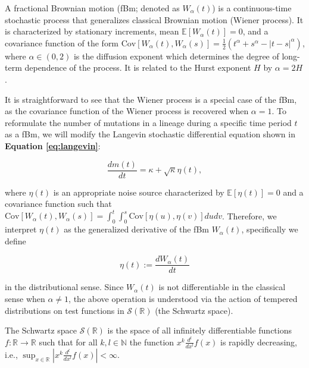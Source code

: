 \begin{definition}
    A fractional Brownian motion (fBm; denoted as $W_\alpha(t)$) is a continuous-time stochastic process that generalizes classical Brownian motion (Wiener process). It is characterized by stationary increments, mean $\mathbb{E}\left[W_\alpha(t)\right]=0$, and a covariance function of the form $\text{Cov}\left[W_\alpha(t),W_\alpha(s)\right] = \frac{1}{2}\left(t^\alpha + s^\alpha - |t-s|^\alpha\right)$, where $\alpha\in\left(0,2\right)$ is the diffusion exponent which determines the degree of long-term dependence of the process. It is related to the Hurst exponent $H$ by $\alpha = 2H$.
\end{definition}

It is straightforward to see that the Wiener process is a special case of the fBm, as the covariance function of the Wiener process is recovered when $\alpha = 1$. To reformulate the number of mutations in a lineage during a specific time period $t$ as a fBm, we will modify the Langevin stochastic differential equation shown in \textbf{Equation \ref{eq:langevin}}:

\begin{equation}
    \frac{dm(t)}{dt} = \kappa + \sqrt{\kappa}\eta(t)\label{eq:langevin-fbm},
\end{equation}

\noindent where $\eta(t)$ is an appropriate noise source characterized by $\mathbb{E}\left[\eta(t)\right]=0$ and a covariance function such that $\text{Cov}\left[W_\alpha(t),W_\alpha(s)\right] = \int_0^t\int_0^s\text{Cov}\left[\eta(u),\eta(v)\right]dudv$. Therefore, we interpret $\eta (t)$ as the generalized derivative of the fBm $W_\alpha(t)$, specifically we define

$$
\eta(t) := \frac{dW_\alpha(t)}{dt}
$$

\noindent in the distributional sense. Since $W_\alpha(t)$ is not differentiable in the classical sense when $\alpha\neq 1$, the above operation is understood via the action of tempered distributions on test functions in $\mathcal{S}(\mathbb{R})$ (the Schwartz space).

\begin{definition}
    The Schwartz space $\mathcal{S}(\mathbb{R})$ is the space of all infinitely differentiable functions $f:\mathbb{R}\to\mathbb{R}$ such that for all $k,l\in\mathbb{N}$ the function $x^k\frac{d^l}{dx^l}f(x)$ is rapidly decreasing, i.e., $\sup_{x\in\mathbb{R}}\left|x^k\frac{d^l}{dx^l}f(x)\right| < \infty$.
\end{definition}

